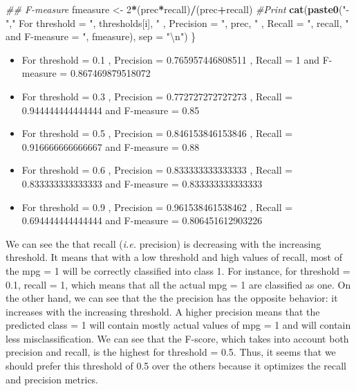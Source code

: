 \documentclass[
  12pt,
  oneside]{report}
\newenvironment{Shaded}{\begin{snugshade}}{\end{snugshade}}
\newcommand{\CharTok}[1]{\textcolor[rgb]{0.31,0.60,0.02}{#1}}
\newcommand{\CommentTok}[1]{\textcolor[rgb]{0.56,0.35,0.01}{\textit{#1}}}
\newcommand{\DataTypeTok}[1]{\textcolor[rgb]{0.13,0.29,0.53}{#1}}
\newcommand{\DecValTok}[1]{\textcolor[rgb]{0.00,0.00,0.81}{#1}}
\newcommand{\KeywordTok}[1]{\textcolor[rgb]{0.13,0.29,0.53}{\textbf{#1}}}
\newcommand{\NormalTok}[1]{#1}
\newcommand{\OperatorTok}[1]{\textcolor[rgb]{0.81,0.36,0.00}{\textbf{#1}}}
\newcommand{\StringTok}[1]{\textcolor[rgb]{0.31,0.60,0.02}{#1}}
\providecommand{\tightlist}{%
  \setlength{\itemsep}{0pt}\setlength{\parskip}{0pt}}
\begin{document}
\begin{Shaded}
\begin{Highlighting}[]
  \CommentTok{## F-measure}
\NormalTok{  fmeasure <-}\StringTok{ }\DecValTok{2}\OperatorTok{*}\NormalTok{(prec}\OperatorTok{*}\NormalTok{recall)}\OperatorTok{/}\NormalTok{(prec}\OperatorTok{+}\NormalTok{recall)}
  \CommentTok{#Print}
  \KeywordTok{cat}\NormalTok{(}\KeywordTok{paste0}\NormalTok{(}\StringTok{"-"}\NormalTok{,}\StringTok{" For threshold = "}\NormalTok{, thresholds[i],}
               \StringTok{" , Precision = "}\NormalTok{, prec,}
               \StringTok{" , Recall = "}\NormalTok{, recall,}
               \StringTok{" and F-measure = "}\NormalTok{, fmeasure), }\DataTypeTok{sep =} \StringTok{"}\CharTok{\textbackslash{}n}\StringTok{"}\NormalTok{)}
\NormalTok{\}}
\end{Highlighting}
\end{Shaded}

\begin{itemize}
\tightlist
\item
  For threshold = 0.1 , Precision = 0.765957446808511 , Recall = 1 and F-measure = 0.867469879518072
\item
  For threshold = 0.3 , Precision = 0.772727272727273 , Recall = 0.944444444444444 and F-measure = 0.85
\item
  For threshold = 0.5 , Precision = 0.846153846153846 , Recall = 0.916666666666667 and F-measure = 0.88
\item
  For threshold = 0.6 , Precision = 0.833333333333333 , Recall = 0.833333333333333 and F-measure = 0.833333333333333
\item
  For threshold = 0.9 , Precision = 0.961538461538462 , Recall = 0.694444444444444 and F-measure = 0.806451612903226
\end{itemize}

We can see the that recall (\emph{i.e.} precision) is decreasing with the increasing threshold. It means that with a low threshold and high values of recall, most of the mpg = 1 will be correctly classified into class 1. For instance, for threshold = 0.1, recall = 1, which means that all the actual mpg = 1 are classified as one.
On the other hand, we can see that the the precision has the opposite behavior: it increases with the increasing threshold. A higher precision means that the predicted class = 1 will contain mostly actual values of mpg = 1 and will contain less misclassification.
We can see that the F-score, which takes into account both precision and recall, is the highest for threshold = 0.5. Thus, it seems that we should prefer this threshold of 0.5 over the others because it optimizes the recall and precision metrics.
\end{document}
